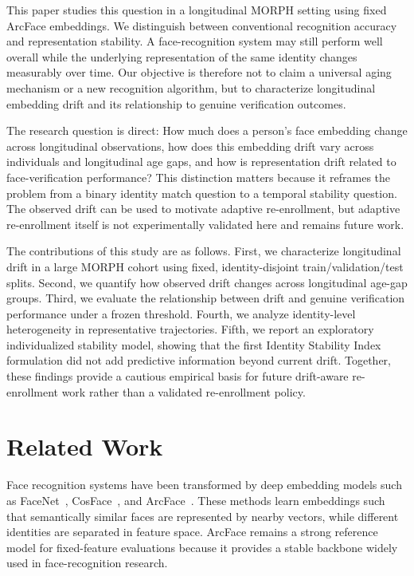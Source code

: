 \documentclass[conference]{IEEEtran}
\begin{document}
This paper studies this question in a longitudinal MORPH setting using fixed ArcFace embeddings. We distinguish between conventional recognition accuracy and representation stability. A face-recognition system may still perform well overall while the underlying representation of the same identity changes measurably over time. Our objective is therefore not to claim a universal aging mechanism or a new recognition algorithm, but to characterize longitudinal embedding drift and its relationship to genuine verification outcomes.

The research question is direct: How much does a person's face embedding change across longitudinal observations, how does this embedding drift vary across individuals and longitudinal age gaps, and how is representation drift related to face-verification performance? This distinction matters because it reframes the problem from a binary identity match question to a temporal stability question. The observed drift can be used to motivate adaptive re-enrollment, but adaptive re-enrollment itself is not experimentally validated here and remains future work.

The contributions of this study are as follows. First, we characterize longitudinal drift in a large MORPH cohort using fixed, identity-disjoint train/validation/test splits. Second, we quantify how observed drift changes across longitudinal age-gap groups. Third, we evaluate the relationship between drift and genuine verification performance under a frozen threshold. Fourth, we analyze identity-level heterogeneity in representative trajectories. Fifth, we report an exploratory individualized stability model, showing that the first Identity Stability Index formulation did not add predictive information beyond current drift. Together, these findings provide a cautious empirical basis for future drift-aware re-enrollment work rather than a validated re-enrollment policy.

\section{Related Work}
\label{sec:relatedwork}
Face recognition systems have been transformed by deep embedding models such as FaceNet~\cite{schroff2015facenet}, CosFace~\cite{wang2018cosface}, and ArcFace~\cite{deng2019arcface}. These methods learn embeddings such that semantically similar faces are represented by nearby vectors, while different identities are separated in feature space. ArcFace remains a strong reference model for fixed-feature evaluations because it provides a stable backbone widely used in face-recognition research.
\end{document}
